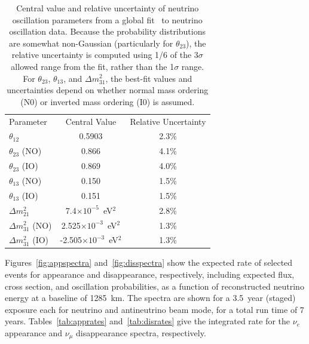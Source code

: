 \begin{table}[]
    \centering
    \begin{tabular}{lcc}
 Parameter &    Central Value & Relative Uncertainty \\
\toprowrule
$\theta_{12}$ & 0.5903 & 2.3\% \\ \colhline
$\theta_{23}$ (NO) & 0.866  & 4.1\% \\ 
$\theta_{23}$ (IO) & 0.869  & 4.0\% \\ \colhline
$\theta_{13}$ (NO) & 0.150  & 1.5\% \\ 
$\theta_{13}$ (IO) & 0.151  & 1.5\% \\ \colhline
$\Delta m^2_{21}$ & 7.4$\times10^{-5}$~eV$^2$ & 2.8\% \\ \colhline
$\Delta m^2_{31}$ (NO) & 2.525$\times10^{-3}$~eV$^2$ &  1.3\% \\
$\Delta m^2_{31}$ (IO) & -2.505$\times10^{-3}$~eV$^2$ &  1.3\% \\
    \end{tabular}
    \caption{Central value and relative uncertainty of neutrino oscillation parameters from a global fit~\cite{Esteban:2018azc,nufitweb} to neutrino oscillation data. Because the probability distributions are somewhat non-Gaussian (particularly for $\theta_{23}$), the relative uncertainty is computed using 1/6 of the 3$\sigma$ allowed range from the fit, rather than the 1$\sigma$ range.   For $\theta_{23}$, $\theta_{13}$, and $\Delta m^2_{31}$, the best-fit values and uncertainties depend on whether normal mass ordering (N0) or inverted mass ordering (I0) is assumed.}
    \label{tab:oscpar_nufit}
\end{table}

Figures~\ref{fig:appspectra} and~\ref{fig:disspectra} show the expected rate of selected events for \nue appearance and \numu disappearance, respectively, including expected flux, cross section, and oscillation probabilities, as a function of reconstructed neutrino energy at a baseline of
\num{1285}~km. The spectra are shown for a \num{3.5}~year (staged) exposure each for neutrino and antineutrino beam mode, for a total run time of \num{7} years. Tables~\ref{tab:apprates} and~\ref{tab:disrates} give the integrated rate for the $\nu_e$ appearance and $\nu_\mu$ disappearance spectra, respectively.  

